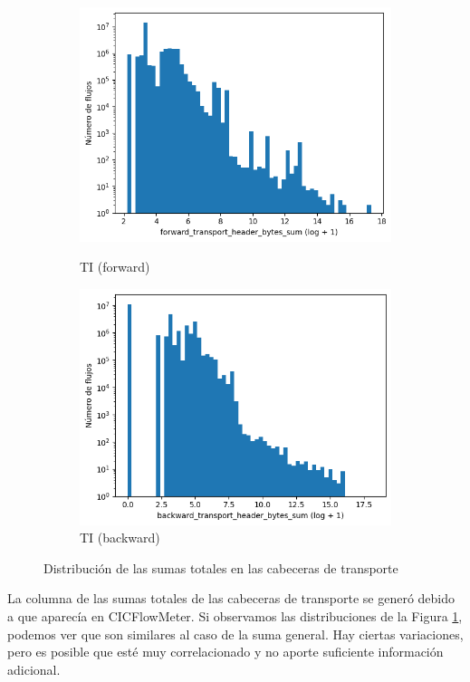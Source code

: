\begin{figure}[H]
\begin{subfigure}[b]{0.26\textwidth}
        \includegraphics[width=\linewidth]{media/packet_pincer_toniot/forward_transport_header_bytes_sum_log_x_log_y.png}
        \caption{TI (forward)}
        \includegraphics[width=\linewidth]{media/packet_pincer_toniot/backward_transport_header_bytes_sum_log_x_log_y.png}
        \caption{TI (backward)}
    \end{subfigure}
       \caption{Distribución de las sumas totales en las cabeceras de transporte}
       \label{fig:packet_pincer_bidirectional_transport_header_bytes_sum}
\end{figure}

La columna de las sumas totales de las cabeceras de transporte se generó debido a que aparecía en CICFlowMeter. Si observamos las distribuciones de la Figura \ref{fig:packet_pincer_bidirectional_transport_header_bytes_sum}, podemos ver que son similares al caso de la suma general. Hay ciertas variaciones, pero es posible que esté muy correlacionado y no aporte suficiente información adicional.

